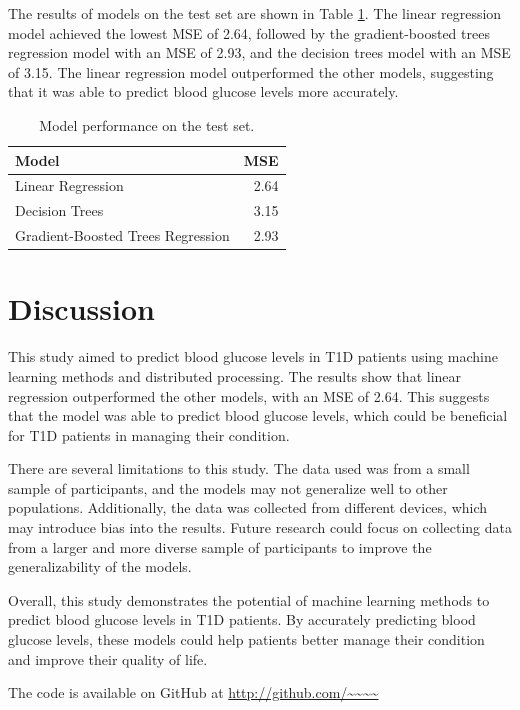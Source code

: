 \documentclass[
	a4paper, %
	10pt, %
	unnumberedsections, %
	twoside, %
]{LTJournalArticle}
\begin{document}
The results of models on the test set are shown in Table \ref{tab:distcounts}. The linear regression model achieved the lowest MSE of 2.64, followed by the gradient-boosted trees regression model with an MSE of 2.93, and the decision trees model with an MSE of 3.15. The linear regression model outperformed the other models, suggesting that it was able to predict blood glucose levels more accurately.

\begin{table}[h!]
	\caption{Model performance on the test set.}
	\centering
	\begin{tabular}{l r}
		\toprule
		Model & MSE \\
		\midrule
		Linear Regression & 2.64 \\
		Decision Trees & 3.15 \\
		Gradient-Boosted Trees Regression & 2.93 \\
		\bottomrule
	\end{tabular}
	\label{tab:distcounts}
\end{table}


\section{Discussion}

This study aimed to predict blood glucose levels in T1D patients using machine learning methods and distributed processing. The results show that linear regression outperformed the other models, with an MSE of 2.64. This suggests that the model was able to predict blood glucose levels, which could be beneficial for T1D patients in managing their condition.

There are several limitations to this study. The data used was from a small sample of participants, and the models may not generalize well to other populations. Additionally, the data was collected from different devices, which may introduce bias into the results. Future research could focus on collecting data from a larger and more diverse sample of participants to improve the generalizability of the models.

Overall, this study demonstrates the potential of machine learning methods to predict blood glucose levels in T1D patients. By accurately predicting blood glucose levels, these models could help patients better manage their condition and improve their quality of life.

The code is available on GitHub at \url{http://github.com/~~~~}


\end{document}
